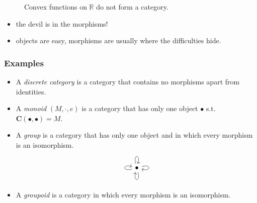 \documentclass[UTF8,11pt,colorlinks,compress,openany]{beamer}%
\begin{document}
\begin{frame}\frametitle{}
\begin{figure}
$\;$
$\;$
\caption{
Convex functions on $\mathbb{R}$ do not form a category.}
\end{figure}
\begin{itemize}
	\item the devil is in the morphisms!
	\item objects are easy, morphisms are usually where the difficulties hide.
\end{itemize}
\end{frame}

\begin{frame}\frametitle{Examples}
\setlength\abovedisplayskip{0pt}
\setlength\belowdisplayskip{0pt}
\begin{itemize}
	\item A \emph{discrete category} is a category that contains no morphisms apart from identities.
	\item A \emph{monoid} $(M,\cdot,e)$ is a category that has only one object $\bullet$ s.t. $\mathbf{C}(\bullet,\bullet)=M$.
	\item A \emph{group} is a category that has only one object and in which every morphism is an isomorphism.\vspace*{-2ex}
\[
\begin{tikzcd}
\bullet \arrow[loop left] \arrow[loop right] \arrow[loop above] \arrow[loop below]
\end{tikzcd}
\]
	\item A \emph{groupoid} is a category in which every morphism is an isomorphism.
\end{itemize}
\end{frame}
\end{document}
